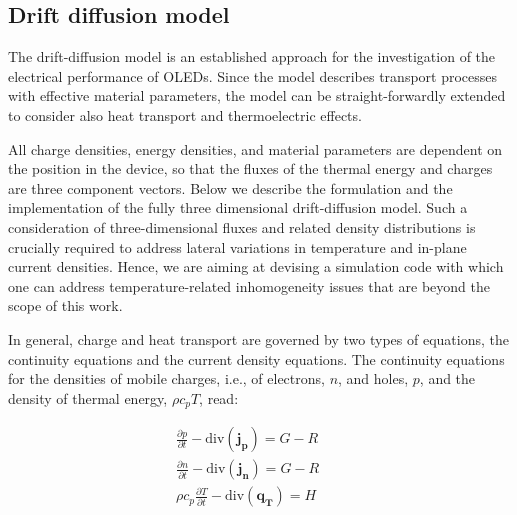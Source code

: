 \documentclass[%
9pt,
 aip,
rsi,%
 amsmath,amssymb,
preprint,%
]{revtex4-1}
\begin{document}
\subsection{Drift diffusion model} 
The drift-diffusion model is an established approach for the investigation of the electrical performance of OLEDs.\cite{Davids1998,Knapp2010,Knapp2011,Ruhstaller2003,Slawinski2011,VanMensfoort2008} 
Since the model describes transport processes with effective material parameters, the model can be straight-forwardly extended to consider also heat transport and thermoelectric effects.\cite{Park2011a}

All charge densities, energy densities, and material parameters are dependent on the position in the device, %
so that the fluxes of the thermal energy and charges are three component vectors.
Below we describe the formulation and the implementation of the fully three dimensional drift-diffusion model.
Such a consideration of three-dimensional fluxes and related density distributions is crucially required to address lateral variations in temperature and in-plane current densities. 
Hence, we are aiming at devising a simulation code with which one can address temperature-related inhomogeneity issues that are beyond the scope of this work. 

In general, charge and heat transport are governed by two types of equations, the continuity equations and the current density equations.
The continuity equations for the densities of mobile charges, i.e., of electrons, $n$, and holes, $p$, and the density of thermal energy, $\rho c_p T$, read:

\begin{subequations}
	\begin{gather}
		\frac{\partial p}{\partial t} - \mathrm{div}\left( \mathbf{j_p}\right) =G-R\label{eq:contp}\\	
		\frac{\partial n}{\partial t} - \mathrm{div}\left( \mathbf{j_n}\right)=G-R\label{eq:contn}\\
		\rho c_p \frac{\partial T}{\partial t}-\mathrm{div}\left(\mathbf{q_T}\right)=H\label{eq:contT}\qquad 
	\end{gather}
    \label{eq:cont}
\end{subequations}
\end{document}
